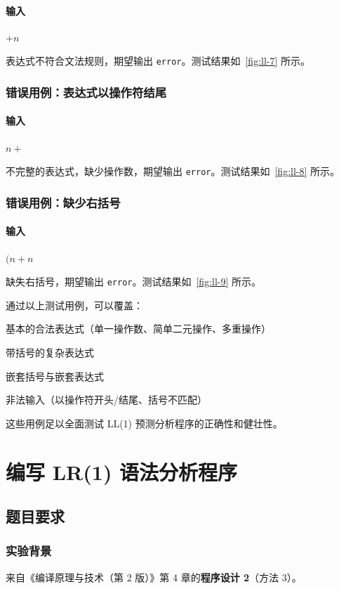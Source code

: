 \paragraph{输入} $+n$

表达式不符合文法规则，期望输出 \texttt{error}。测试结果如~\autoref{fig:ll-7} 所示。

\subsubsection{错误用例：表达式以操作符结尾}
\paragraph{输入} $n+$

不完整的表达式，缺少操作数，期望输出 \texttt{error}。测试结果如~\autoref{fig:ll-8} 所示。

\subsubsection{错误用例：缺少右括号}
\paragraph{输入} $(n+n$

缺失右括号，期望输出 \texttt{error}。测试结果如~\autoref{fig:ll-9} 所示。

通过以上测试用例，可以覆盖：\begin{compactitem}
	\item 基本的合法表达式（单一操作数、简单二元操作、多重操作）
	\item 带括号的复杂表达式
	\item 嵌套括号与嵌套表达式
	\item 非法输入（以操作符开头/结尾、括号不匹配）
\end{compactitem}

这些用例足以全面测试 LL(1) 预测分析程序的正确性和健壮性。

\section{编写 LR(1) 语法分析程序}

\subsection{题目要求}

\subsubsection{实验背景}
来自《编译原理与技术（第 2 版）》第 4 章的\textbf{程序设计 2}（方法 3）。

